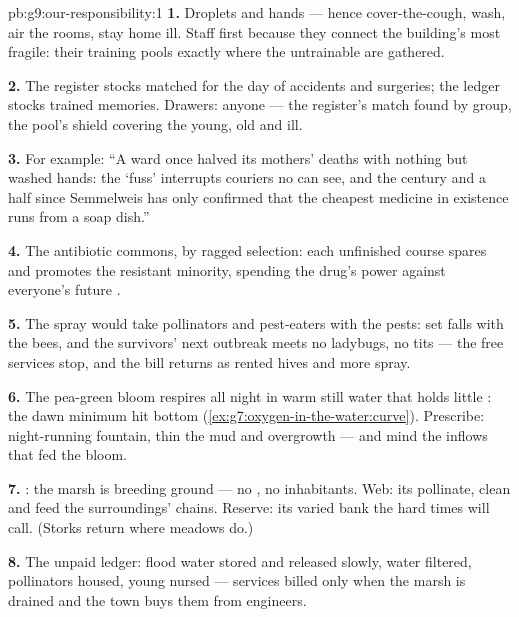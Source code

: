 \begin{solution}{pb:g9:our-responsibility:1}
\textbf{1.} Droplets and hands --- hence cover-the-cough,
wash, air the rooms, stay home ill. Staff first because
they connect the building's most fragile: their training
pools exactly where the untrainable are gathered.

\textbf{2.} The register stocks matched  for the
day of accidents and surgeries; the ledger stocks trained
memories. Drawers: anyone --- the register's match found
by group, the pool's shield covering the young, old and
ill.

\textbf{3.} For example: ``A ward once halved its
mothers' deaths with nothing but washed hands: the
`fuss' interrupts couriers no  can see, and the
century and a half since Semmelweis has only confirmed
that the cheapest medicine in existence runs from a soap
dish.''

\textbf{4.} The antibiotic commons, by ragged selection:
each unfinished course spares and promotes the resistant
minority, spending the drug's power against everyone's
future .

\textbf{5.} The spray would take pollinators and
pest-eaters with the pests:  set falls with the
bees, and the survivors' next outbreak meets no
ladybugs, no tits --- the free services stop, and the
bill returns as rented hives and more spray.

\textbf{6.} The pea-green bloom respires all night in
warm still water that holds little : the dawn
minimum hit bottom
(\cref{ex:g7:oxygen-in-the-water:curve}). Prescribe:
night-running fountain, thin the mud and overgrowth ---
and mind the  inflows that fed the bloom.

\textbf{7.} : the marsh is breeding ground ---
no , no inhabitants. Web: its  pollinate,
clean and feed the surroundings' chains. Reserve: its
varied  bank the  hard times will
call. (Storks return where meadows do.)

\textbf{8.} The unpaid ledger: flood water stored and
released slowly, water filtered, pollinators housed,
young  nursed --- services billed only when the
marsh is drained and the town buys them from engineers.


\end{solution}
